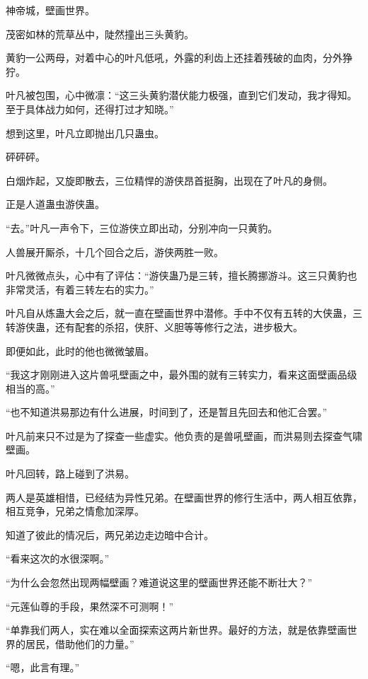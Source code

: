 
\begin{this_body}

神帝城，壁画世界。

茂密如林的荒草丛中，陡然撞出三头黄豹。

黄豹一公两母，对着中心的叶凡低吼，外露的利齿上还挂着残破的血肉，分外狰狞。

叶凡被包围，心中微凛：“这三头黄豹潜伏能力极强，直到它们发动，我才得知。至于具体战力如何，还得打过才知晓。”

想到这里，叶凡立即抛出几只蛊虫。

砰砰砰。

白烟炸起，又旋即散去，三位精悍的游侠昂首挺胸，出现在了叶凡的身侧。

正是人道蛊虫游侠蛊。

“去。”叶凡一声令下，三位游侠立即出动，分别冲向一只黄豹。

人兽展开厮杀，十几个回合之后，游侠两胜一败。

叶凡微微点头，心中有了评估：“游侠蛊乃是三转，擅长腾挪游斗。这三只黄豹也非常灵活，有着三转左右的实力。”

叶凡自从炼蛊大会之后，就一直在壁画世界中潜修。手中不仅有五转的大侠蛊，三转游侠蛊，还有配套的杀招，侠肝、义胆等等修行之法，进步极大。

即便如此，此时的他也微微皱眉。

“我这才刚刚进入这片兽吼壁画之中，最外围的就有三转实力，看来这面壁画品级相当的高。”

“也不知道洪易那边有什么进展，时间到了，还是暂且先回去和他汇合罢。”

叶凡前来只不过是为了探查一些虚实。他负责的是兽吼壁画，而洪易则去探查气啸壁画。

叶凡回转，路上碰到了洪易。

两人是英雄相惜，已经结为异性兄弟。在壁画世界的修行生活中，两人相互依靠，相互竞争，兄弟之情愈加深厚。

知道了彼此的情况后，两兄弟边走边暗中合计。

“看来这次的水很深啊。”

“为什么会忽然出现两幅壁画？难道说这里的壁画世界还能不断壮大？”

“元莲仙尊的手段，果然深不可测啊！”

“单靠我们两人，实在难以全面探索这两片新世界。最好的方法，就是依靠壁画世界的居民，借助他们的力量。”

“嗯，此言有理。”


\end{this_body}
